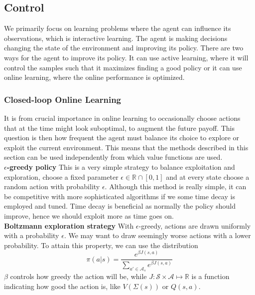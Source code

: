 \subsection{Control}
\label{subsec:control}
We primarily focus on learning problems where the agent can influence its observations, which is interactive learning. The agent is making decisions changing the state of the environment and improving its policy. There are two ways for the agent to improve its policy. It can use active learning, where it will control the samples such that it maximizes finding a good policy or it can use online learning, where the online performance is optimized.

\subsubsection{Closed-loop Online Learning}
\label{subsec:clil}
It is from crucial importance in online learning to occasionally choose  actions that at the time might look suboptimal, to augment the future payoff. This question is then how frequent the agent must balance its choice to explore or exploit the current environment. This means that the methods described in this section can be used independently from which value functions are used. \\

\textbf{$\epsilon$-greedy policy}
This is a very simple strategy to balance exploitation and exploration, choose a fixed parameter $\epsilon \in \mathbb{R} \cap [0,1]$ and at every state choose a random action with probability $\epsilon$. Although this method is really simple, it can be competitive with more sophisticated algorithms if we some time decay is employed and tuned. Time decay is beneficial as normally the policy should improve, hence we should exploit more as time goes on. \\

\textbf{Boltzmann exploration strategy}
With $\epsilon$-greedy, actions are drawn uniformly with a probability $\epsilon$. We may want to draw seemingly worse actions with a lower probability. To attain this property, we can use the distribution
\begin{equation}
\pi(a|s)=\frac{e^{\beta J(s,a)}}{\sum_{a' \in \mathcal{A}_s} e^{\beta J(s,a)}}
\end{equation}
$\beta$ controls how greedy the action will be, while $J: \mathcal{S} \times \mathcal{A} \mapsto \mathbb{R}$ is a function indicating how good the action is, like $V(\Sigma(s))$ or $Q(s,a)$. 

